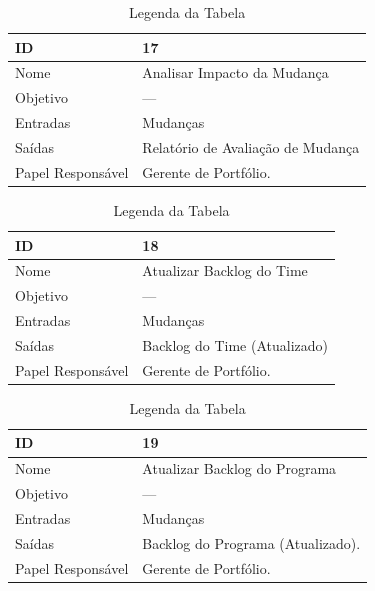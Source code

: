 \begin{table}[H]
  \centering
    \begin{tabular}{| m{5em} | m{10cm} |}
      \hline
      ID       & 17   \\ \hline
      Nome     & Analisar Impacto da Mudança \\ \hline
      Objetivo & ---  \\ \hline
      Entradas & Mudanças \\ \hline
      Saídas   & Relatório de Avaliação de Mudança \\ \hline
      Papel Responsável   & Gerente de Portfólio. \\ \hline
    \end{tabular}
    \caption{Legenda da Tabela}
    \label{tabela:atividade17}
\end{table}

\begin{table}[H]
  \centering
    \begin{tabular}{| m{5em} | m{10cm} |}
      \hline
      ID       & 18   \\ \hline
      Nome     & Atualizar Backlog do Time  \\ \hline
      Objetivo & ---  \\ \hline
      Entradas & Mudanças \\ \hline
      Saídas   & Backlog do Time (Atualizado) \\ \hline
      Papel Responsável   & Gerente de Portfólio. \\ \hline
    \end{tabular}
    \caption{Legenda da Tabela}
    \label{tabela:atividade18}
\end{table}

\begin{table}[H]
  \centering
    \begin{tabular}{| m{5em} | m{10cm} |}
      \hline
      ID       & 19   \\ \hline
      Nome     & Atualizar Backlog do Programa  \\ \hline
      Objetivo & ---  \\ \hline
      Entradas & Mudanças\\ \hline
      Saídas   & Backlog do Programa (Atualizado). \\ \hline
      Papel Responsável   & Gerente de Portfólio. \\ \hline
    \end{tabular}
    \caption{Legenda da Tabela}
    \label{tabela:atividade19}
\end{table}

